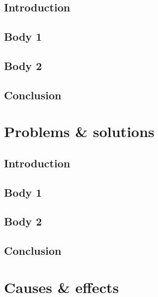 \documentclass[11pt,a4paper]{article}
\begin{document}
\subsection*{Introduction}
\vspace{1cm}
\subsection*{Body 1}
\vspace{1cm}
\subsection*{Body 2}
\vspace{1cm}
\subsection*{Conclusion}
\vspace{1cm}
\clearpage
\section*{Problems \& solutions}
\subsection*{Introduction}
\vspace{1cm}
\subsection*{Body 1}
\vspace{1cm}
\subsection*{Body 2}
\vspace{1cm}
\subsection*{Conclusion}
\vspace{1cm}
\clearpage
\section*{Causes \& effects}
\end{document}
